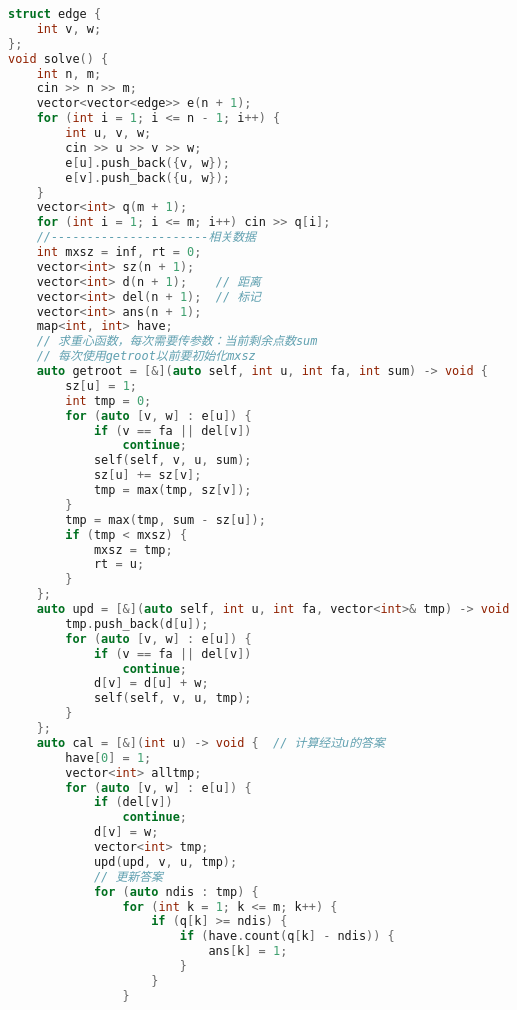 \begin{lstlisting}[language=C++]
struct edge {
    int v, w;
};
void solve() {
    int n, m;
    cin >> n >> m;
    vector<vector<edge>> e(n + 1);
    for (int i = 1; i <= n - 1; i++) {
        int u, v, w;
        cin >> u >> v >> w;
        e[u].push_back({v, w});
        e[v].push_back({u, w});
    }
    vector<int> q(m + 1);
    for (int i = 1; i <= m; i++) cin >> q[i];
    //----------------------相关数据
    int mxsz = inf, rt = 0;
    vector<int> sz(n + 1);
    vector<int> d(n + 1);    // 距离
    vector<int> del(n + 1);  // 标记
    vector<int> ans(n + 1);
    map<int, int> have;
    // 求重心函数，每次需要传参数：当前剩余点数sum
    // 每次使用getroot以前要初始化mxsz
    auto getroot = [&](auto self, int u, int fa, int sum) -> void {
        sz[u] = 1;
        int tmp = 0;
        for (auto [v, w] : e[u]) {
            if (v == fa || del[v])
                continue;
            self(self, v, u, sum);
            sz[u] += sz[v];
            tmp = max(tmp, sz[v]);
        }
        tmp = max(tmp, sum - sz[u]);
        if (tmp < mxsz) {
            mxsz = tmp;
            rt = u;
        }
    };
    auto upd = [&](auto self, int u, int fa, vector<int>& tmp) -> void {
        tmp.push_back(d[u]);
        for (auto [v, w] : e[u]) {
            if (v == fa || del[v])
                continue;
            d[v] = d[u] + w;
            self(self, v, u, tmp);
        }
    };
    auto cal = [&](int u) -> void {  // 计算经过u的答案
        have[0] = 1;
        vector<int> alltmp;
        for (auto [v, w] : e[u]) {
            if (del[v])
                continue;
            d[v] = w;
            vector<int> tmp;
            upd(upd, v, u, tmp);
            // 更新答案
            for (auto ndis : tmp) {
                for (int k = 1; k <= m; k++) {
                    if (q[k] >= ndis) {
                        if (have.count(q[k] - ndis)) {
                            ans[k] = 1;
                        }
                    }
                }

\end{lstlisting}
